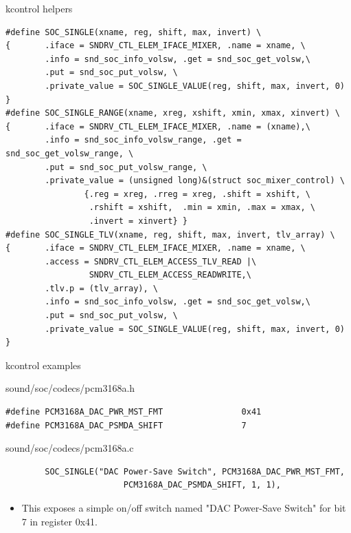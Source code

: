 \begin{frame}[fragile]{kcontrol helpers}
  \begin{block}{}
    \fontsize{9}{9}\selectfont
    \begin{verbatim}
#define SOC_SINGLE(xname, reg, shift, max, invert) \
{       .iface = SNDRV_CTL_ELEM_IFACE_MIXER, .name = xname, \
        .info = snd_soc_info_volsw, .get = snd_soc_get_volsw,\
        .put = snd_soc_put_volsw, \
        .private_value = SOC_SINGLE_VALUE(reg, shift, max, invert, 0) }
#define SOC_SINGLE_RANGE(xname, xreg, xshift, xmin, xmax, xinvert) \
{       .iface = SNDRV_CTL_ELEM_IFACE_MIXER, .name = (xname),\
        .info = snd_soc_info_volsw_range, .get = snd_soc_get_volsw_range, \
        .put = snd_soc_put_volsw_range, \
        .private_value = (unsigned long)&(struct soc_mixer_control) \
                {.reg = xreg, .rreg = xreg, .shift = xshift, \
                 .rshift = xshift,  .min = xmin, .max = xmax, \
                 .invert = xinvert} }
#define SOC_SINGLE_TLV(xname, reg, shift, max, invert, tlv_array) \
{       .iface = SNDRV_CTL_ELEM_IFACE_MIXER, .name = xname, \
        .access = SNDRV_CTL_ELEM_ACCESS_TLV_READ |\
                 SNDRV_CTL_ELEM_ACCESS_READWRITE,\
        .tlv.p = (tlv_array), \
        .info = snd_soc_info_volsw, .get = snd_soc_get_volsw,\
        .put = snd_soc_put_volsw, \
        .private_value = SOC_SINGLE_VALUE(reg, shift, max, invert, 0) }
    \end{verbatim}
  \end{block}
\end{frame}

\begin{frame}[fragile]{kcontrol examples}
  \begin{block}{sound/soc/codecs/pcm3168a.h}
    \fontsize{9}{9}\selectfont
    \begin{verbatim}
#define PCM3168A_DAC_PWR_MST_FMT                0x41
#define PCM3168A_DAC_PSMDA_SHIFT                7
    \end{verbatim}
  \end{block}
  \begin{block}{sound/soc/codecs/pcm3168a.c}
    \fontsize{9}{9}\selectfont
    \begin{verbatim}
        SOC_SINGLE("DAC Power-Save Switch", PCM3168A_DAC_PWR_MST_FMT,
                        PCM3168A_DAC_PSMDA_SHIFT, 1, 1),
    \end{verbatim}
  \end{block}
  \begin{itemize}
  \item This exposes a simple on/off switch named "DAC Power-Save
    Switch" for bit 7 in register 0x41.
  \end{itemize}
\end{frame}

